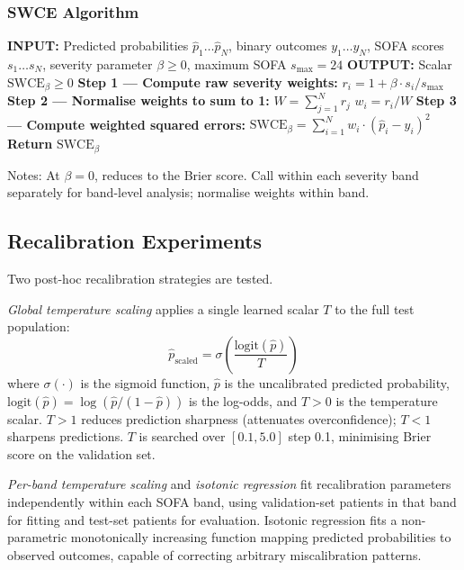 \documentclass{ieeeaccess}
\begin{document}
\subsubsection{SWCE Algorithm}

\begin{algorithmic}
\STATE \textbf{INPUT:} Predicted probabilities $\hat{p}_1 \dots \hat{p}_N$, binary outcomes $y_1 \dots y_N$, SOFA scores $s_1 \dots s_N$, severity parameter $\beta \ge 0$, maximum SOFA $s_{\max}=24$
\STATE \textbf{OUTPUT:} Scalar $\text{SWCE}_\beta \ge 0$
\STATE \textbf{Step 1 — Compute raw severity weights:}
    \STATE $r_i = 1 + \beta \cdot s_i / s_{\max}$
\ENDFOR
\STATE \textbf{Step 2 — Normalise weights to sum to 1:}
\STATE $W = \sum_{j=1}^{N} r_j$
    \STATE $w_i = r_i / W$
\ENDFOR
\STATE \textbf{Step 3 — Compute weighted squared errors:}
\STATE $\text{SWCE}_\beta = \sum_{i=1}^{N} w_i \cdot (\hat{p}_i - y_i)^2$
\STATE \textbf{Return} $\text{SWCE}_\beta$
\end{algorithmic}
Notes: At $\beta=0$, reduces to the Brier score. Call within each severity band separately for band-level analysis; normalise weights within band.


\subsection{Recalibration Experiments}

Two post-hoc recalibration strategies are tested.

\textit{Global temperature scaling} applies a single learned scalar $T$ to the full test population:
\begin{equation}
\hat{p}_{\text{scaled}} = \sigma\!\left(\frac{\text{logit}(\hat{p})}{T}\right)
\label{eq:temp}
\end{equation}
where $\sigma(\cdot)$ is the sigmoid function, $\hat{p}$ is the uncalibrated predicted probability, $\text{logit}(\hat{p}) = \log(\hat{p}/(1-\hat{p}))$ is the log-odds, and $T > 0$ is the temperature scalar. $T > 1$ reduces prediction sharpness (attenuates overconfidence); $T < 1$ sharpens predictions. $T$ is searched over $[0.1, 5.0]$ step 0.1, minimising Brier score on the validation set.

\textit{Per-band temperature scaling} and \textit{isotonic regression} fit recalibration parameters independently within each SOFA band, using validation-set patients in that band for fitting and test-set patients for evaluation. Isotonic regression \cite{b17} fits a non-parametric monotonically increasing function mapping predicted probabilities to observed outcomes, capable of correcting arbitrary miscalibration patterns.
\end{document}
